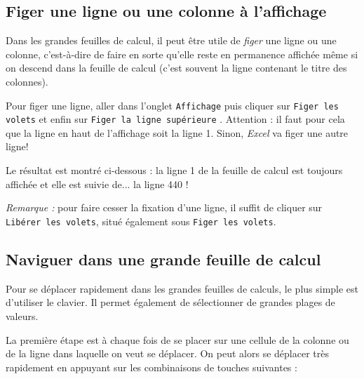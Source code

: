 
\subsection{Figer une ligne ou une colonne à l'affichage}\label{Calc3fixer} 

Dans les grandes feuilles de calcul, il peut être utile de \emph{figer} une ligne ou une colonne, c'est-à-dire de faire en sorte qu'elle reste en permanence affichée même si on descend dans la feuille de calcul (c'est souvent la ligne contenant le titre des colonnes).


Pour figer une ligne, aller dans l'onglet \texttt{Affichage}  puis cliquer sur \texttt{Figer les volets}  et enfin sur \texttt{Figer la ligne supérieure} . Attention : il faut pour cela que la ligne en haut de l'affichage soit la ligne 1. Sinon, \emph{Excel} va figer une autre ligne!


Le résultat est montré ci-dessous : la ligne 1 de la feuille de calcul est toujours affichée et elle est suivie de... la ligne 440 !


\emph{Remarque :} pour faire cesser la fixation d'une ligne, il suffit de cliquer sur \texttt{Libérer les volets}, situé également sous \texttt{Figer les volets}.


\subsection{Naviguer dans une grande feuille de calcul}\label{Calc3navigue} 
Pour se déplacer rapidement dans les grandes feuilles de calculs, le plus simple est d'utiliser le clavier. Il permet également de sélectionner de grandes plages de valeurs.

La première étape est à chaque fois de se placer sur une cellule de la colonne ou de la ligne dans laquelle on veut se déplacer. On peut alors se déplacer très rapidement en appuyant sur les combinaisons de touches suivantes :

